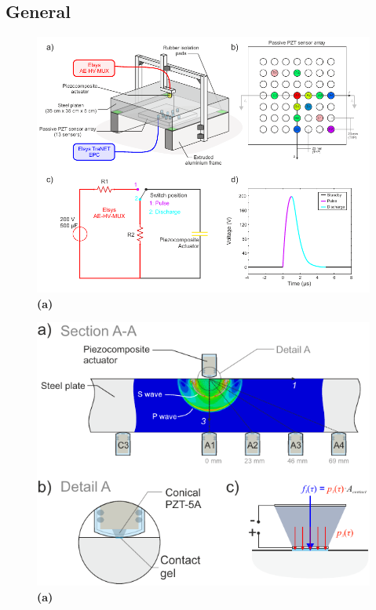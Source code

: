 \documentclass[preprint,3p, 11pt,authoryear]{elsarticle}
\begin{document}
\subsection{General}

\begin{figure}[ht]
     	\centering
\includegraphics[scale= 1.0]{FIG1.pdf} 
\caption{\textbf{(a)}  }
	\label{fig1} 
\end{figure}

\begin{figure}[ht]
     	\centering
\includegraphics[scale= 1.0]{FIG2.pdf} 
\caption{\textbf{(a)}  }
	\label{fig2} 
\end{figure}
\end{document}
